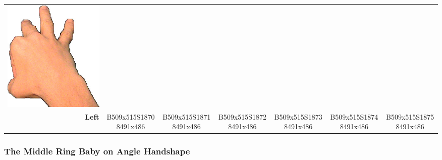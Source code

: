 \documentclass{article}
\begin{document}
\begin{center}
\begin{tabular}{r*{6}{c}}
\includegraphics[scale=0.1]{images/09-01-6.jpg}\\
\textbf{Left}&
B509x515S18708491x486&
B509x515S18718491x486&
B509x515S18728491x486&
B509x515S18738491x486&
B509x515S18748491x486&
B509x515S18758491x486\\
\end{tabular}
\end{center}

\subsubsection{The Middle Ring Baby on Angle Handshape}
\end{document}
